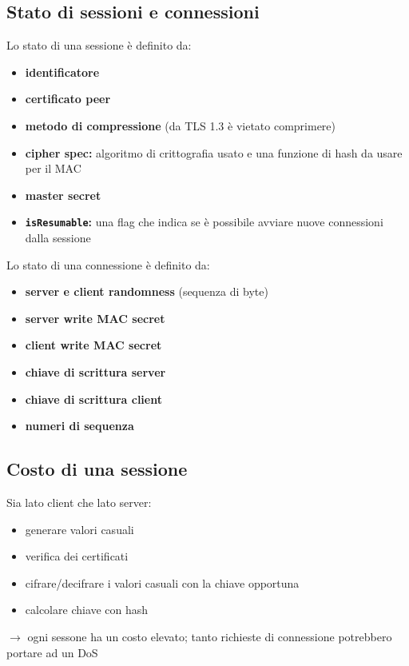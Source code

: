 \subsection{Stato di sessioni e connessioni}

Lo stato di una sessione è definito da:
\begin{itemize}
    \item \textbf{identificatore}
    \item \textbf{certificato peer}
    \item \textbf{metodo di compressione} (da TLS 1.3 è vietato comprimere)
    \item \textbf{cipher spec:} algoritmo di crittografia usato e una funzione di hash da usare per il MAC 
    \item \textbf{master secret}
    \item \textbf{\texttt{isResumable}:} una flag che indica se è possibile avviare nuove connessioni dalla sessione
\end{itemize}

\noindent Lo stato di una connessione è definito da:
\begin{itemize}
    \item \textbf{server e client randomness} (sequenza di byte)
    \item \textbf{server write MAC secret}
    \item \textbf{client write MAC secret}
    \item \textbf{chiave di scrittura server}
    \item \textbf{chiave di scrittura client}
    \item \textbf{numeri di sequenza} 
\end{itemize}

\subsection{Costo di una sessione}
Sia lato client che lato server:
\begin{itemize}
    \item generare valori casuali 
    \item verifica dei certificati
    \item cifrare/decifrare i valori casuali con la chiave opportuna
    \item calcolare chiave con hash 
\end{itemize}

\noindent $\rightarrow$ ogni sessone ha un costo elevato; tanto richieste di connessione 
potrebbero portare ad un DoS

